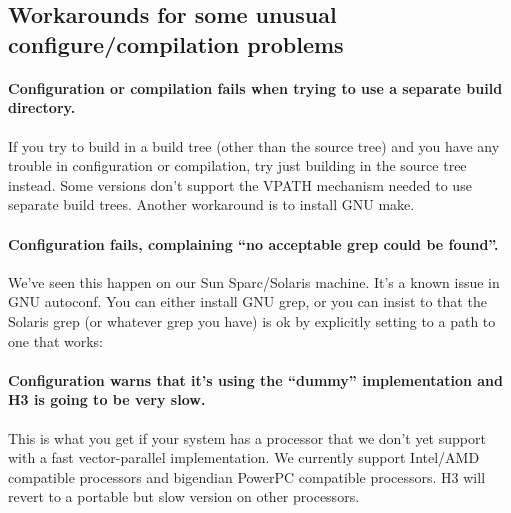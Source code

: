 




\subsection{Workarounds for some unusual configure/compilation problems}

\paragraph{Configuration or compilation fails when trying to use a
  separate build directory.}  If you try to build in a build tree
(other than the source tree) and you have any trouble in configuration
or compilation, try just building in the source tree instead. Some
 versions don't support the VPATH mechanism needed to use
separate build trees. Another workaround is to install GNU make.


\paragraph{Configuration fails, complaining ``no acceptable grep could
  be found''.} We've seen this happen on our Sun Sparc/Solaris
machine. It's a known issue in GNU autoconf. You can either install
GNU grep, or you can insist to  that the Solaris
grep (or whatever grep you have) is ok by explicitly setting
 to a path to one that works:


\paragraph{Configuration warns that it's using the ``dummy''
implementation and H3 is going to be very slow.} This is what you get
if your system has a processor that we don't yet support with a fast
vector-parallel implementation. We currently support Intel/AMD
compatible processors and bigendian PowerPC compatible processors.  H3
will revert to a portable but slow version on other processors.

